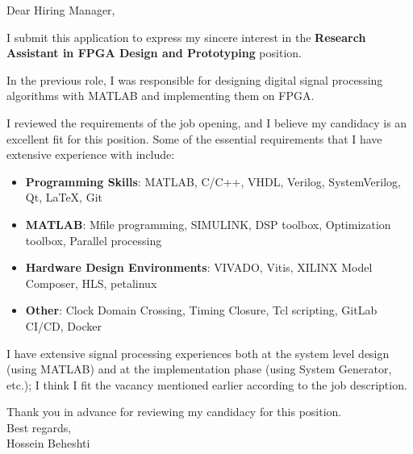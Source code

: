 \documentclass[localFont]{awesome-source-cv} %
\begin{document}
\makecvheader


\bigskip %
Dear Hiring Manager,

\bigskip 

I submit this application to express my sincere interest in the \textbf{Research Assistant in FPGA Design and Prototyping} position.

In the previous role, I was responsible for designing digital signal processing algorithms with MATLAB and implementing them on FPGA.

I reviewed the requirements of the job opening, and I believe my candidacy is an excellent fit for this position. Some of the essential requirements that I have extensive experience with include:

\begin{itemize}
	\item \textbf{Programming Skills}:
	      MATLAB, C/C++, VHDL, Verilog, SystemVerilog, Qt, \LaTeX, Git
	\item \textbf{MATLAB}:
	      Mfile programming, SIMULINK, DSP toolbox, Optimization toolbox, Parallel processing
	\item \textbf{Hardware Design Environments}:
	      VIVADO, Vitis, XILINX Model Composer, HLS, petalinux
	\item \textbf{Other}:
	      Clock Domain Crossing, Timing Closure, Tcl scripting, GitLab CI/CD, Docker
\end{itemize}

I have extensive signal processing experiences both at the system level design (using MATLAB) and at the implementation phase (using System Generator, etc.); I think I fit the vacancy mentioned earlier according to the job description.

Thank you in advance for reviewing my candidacy for this position.\\
\bigskip 
Best regards,\\
\bigskip 
Hossein Beheshti \\
\end{document}
